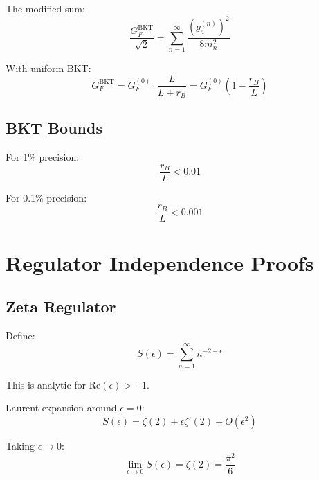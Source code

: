 \documentclass[11pt,a4paper]{article}
\begin{document}
The modified sum:
\begin{equation}
\label{eq:bkt-gf-sum}
\frac{G_F^{\text{BKT}}}{\sqrt{2}} = \sum_{n=1}^\infty \frac{(g_4^{(n)})^2}{8 m_n^2}
\end{equation}

With uniform BKT:
\begin{equation}
\label{eq:bkt-gf-uniform}
G_F^{\text{BKT}} = G_F^{(0)} \cdot \frac{L}{L + r_B} = G_F^{(0)} \left(1 - \frac{r_B}{L}\right)
\end{equation}

\subsection{BKT Bounds}
\label{app:bkt-bounds}

For 1\% precision:
\begin{equation}
\label{eq:bkt-1percent}
\frac{r_B}{L} < 0.01
\end{equation}

For 0.1\% precision:
\begin{equation}
\label{eq:bkt-01percent}
\frac{r_B}{L} < 0.001
\end{equation}

\section{Regulator Independence Proofs}
\label{app:regulator-proofs}

\subsection{Zeta Regulator}
\label{app:zeta-proof}

Define:
\begin{equation}
\label{eq:zeta-s}
S(\epsilon) = \sum_{n=1}^\infty n^{-2-\epsilon}
\end{equation}

This is analytic for $\text{Re}(\epsilon) > -1$.

Laurent expansion around $\epsilon = 0$:
\begin{equation}
\label{eq:zeta-laurent}
S(\epsilon) = \zeta(2) + \epsilon \zeta'(2) + O(\epsilon^2)
\end{equation}

Taking $\epsilon \to 0$:
\begin{equation}
\label{eq:zeta-limit}
\lim_{\epsilon \to 0} S(\epsilon) = \zeta(2) = \frac{\pi^2}{6}
\end{equation}
\end{document}
